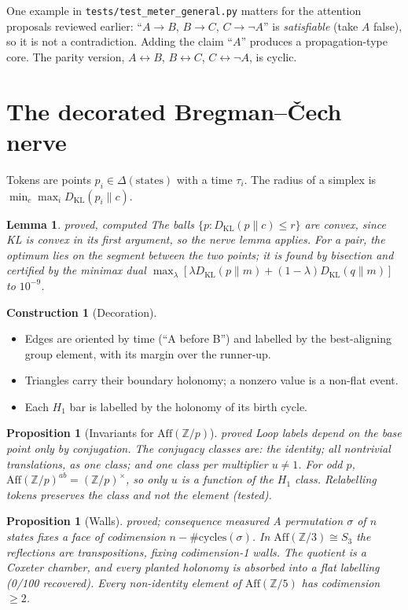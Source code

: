 \documentclass[11pt]{article}
\newtheorem{proposition}[theorem]{Proposition}
\newtheorem{lemma}[theorem]{Lemma}
\theoremstyle{definition}
\newtheorem{construction}[theorem]{Construction}
\theoremstyle{remark}
\newcommand{\Z}{\mathbb{Z}}
\newcommand{\KL}{D_{\mathrm{KL}}}
\newcommand{\Aff}{\mathrm{Aff}}
\newcommand{\st}[1]{\textsf{\small\color{gray}#1}}
\begin{document}
One example in \texttt{tests/test\_meter\_general.py} matters for the attention proposals reviewed earlier: ``$A\to B$, $B\to C$, $C\to\neg A$'' is \emph{satisfiable} (take $A$ false), so it is not a contradiction. Adding the claim ``$A$'' produces a propagation-type core. The parity version, $A\leftrightarrow B$, $B\leftrightarrow C$, $C\leftrightarrow\neg A$, is cyclic.


\section{The decorated Bregman--\v{C}ech nerve}
Tokens are points $p_i\in\Delta(\text{states})$ with a time $\tau_i$. The radius of a simplex is $\min_c\max_i\KL(p_i\|c)$.

\begin{lemma}\label{res:auto18}\st{proved, computed}
The balls $\{p:\KL(p\|c)\le r\}$ are convex, since KL is convex in its first argument, so the nerve lemma applies. For a pair, the optimum lies on the segment between the two points; it is found by bisection and certified by the minimax dual $\max_\lambda[\lambda\KL(p\|m)+(1-\lambda)\KL(q\|m)]$ to $10^{-9}$.
\end{lemma}
\begin{construction}[Decoration]
\begin{itemize}
  \item Edges are oriented by time (``A before B'') and labelled by the best-aligning group element, with its margin over the runner-up.
  \item Triangles carry their boundary holonomy; a nonzero value is a non-flat event.
  \item Each $H_1$ bar is labelled by the holonomy of its birth cycle.
\end{itemize}
\end{construction}
\begin{proposition}[Invariants for $\Aff(\Z/p)$]\label{res:auto19}\st{proved}
Loop labels depend on the base point only by conjugation. The conjugacy classes are: the identity; all nontrivial translations, as one class; and one class per multiplier $u\ne1$. For odd $p$, $\Aff(\Z/p)^{ab}=(\Z/p)^\times$, so only $u$ is a function of the $H_1$ class. Relabelling tokens preserves the class and not the element (tested).
\end{proposition}
\begin{proposition}[Walls]\label{prop:walls}\st{proved; consequence measured}
A permutation $\sigma$ of $n$ states fixes a face of codimension $n-\#\text{cycles}(\sigma)$. In $\Aff(\Z/3)\cong S_3$ the reflections are transpositions, fixing codimension-1 walls. The quotient is a Coxeter chamber, and every planted holonomy is absorbed into a flat labelling (0/100 recovered). Every non-identity element of $\Aff(\Z/5)$ has codimension $\ge2$.
\end{proposition}
\end{document}
